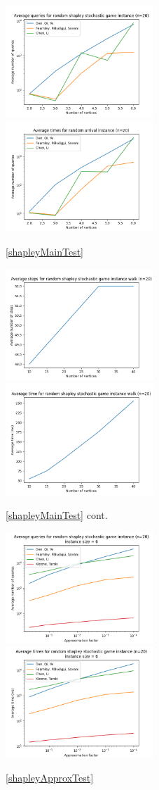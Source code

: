   \begin{figure}[H]
      \centering
      \includegraphics[width=2.2in]{plots/shapley_queries.png}
      \centering
      \includegraphics[width=2.2in]{plots/shapley_time.png}
      \caption{\cref{shapleyMainTest}} \label{shapleyMainPlot}
  \end{figure}
  \begin{figure}[H]
      \centering
      \includegraphics[width=2.2in]{plots/shapley_steps.png}
      \centering
      \includegraphics[width=2.2in]{plots/shapley_wtime.png}
      \caption{\cref{shapleyMainTest} cont.} \label{shapleyWalkPlot}
  \end{figure}
  \begin{figure}[H]
      \centering
      \includegraphics[width=2.2in]{plots/shapley_eps_queries.png}
      \centering
      \includegraphics[width=2.2in]{plots/shapley_eps_times.png}
      \caption{\cref{shapleyApproxTest}} \label{shapleyApproxPlot}
  \end{figure}
